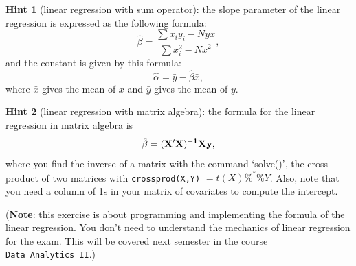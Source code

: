 \documentclass[
]{article}
\begin{document}
\textbf{Hint 1} (linear regression with sum operator): the slope
parameter of the linear regression is expressed as the following
formula:
\[\hat{\beta} = \frac{\sum{x_{i}y_{i}}-N\bar{y}\bar{x}}{\sum{x_i^2}-N\bar{x}^2},\]
and the constant is given by this formula:
\[\hat{\alpha}=\bar{y}-\hat{\beta}\bar{x},\] where \(\bar{x}\) gives the
mean of \(x\) and \(\bar{y}\) gives the mean of \(y\).

\textbf{Hint 2} (linear regression with matrix algebra): the formula for
the linear regression in matrix algebra is
\[\hat{\bf{\beta}} = (\bf{X'X})^{-1} \bf{Xy},\] where you find the
inverse of a matrix with the command `solve()', the cross-product of two
matrices with \texttt{crossprod(X,Y)} \(= t(X)\%^{*}\% Y\). Also, note
that you need a column of 1s in your matrix of covariates to compute the
intercept.

(\textbf{Note}: this exercise is about programming and implementing the
formula of the linear regression. You don't need to understand the
mechanics of linear regression for the exam. This will be covered next
semester in the course \texttt{Data\ Analytics\ II}.)
\end{document}
